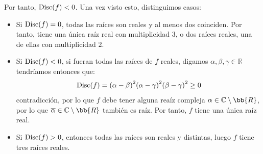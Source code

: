 \begin{ejercicio}
    Por tanto, $\operatorname{Disc}(f) < 0$. Una vez visto esto, distinguimos casos:
    \begin{itemize}
        \item Si $\operatorname{Disc}(f) = 0$, todas las raíces son reales y al menos dos coinciden. Por tanto, tiene una única raíz real con multiplicidad $3$, o dos raíces reales, una de ellas con multiplicidad $2$.
        \item Si $\operatorname{Disc}(f) < 0$, si fueran todas las raíces de $f$ reales, digamos $\alpha,\beta,\gamma\in \mathbb{R}$ tendríamos entonces que:
            \begin{equation*}
                \operatorname{Disc}(f) = {(\alpha-\beta)}^{2}{(\alpha-\gamma)}^{2}{(\beta-\gamma)}^{2} \geq 0
            \end{equation*}
            contradicción, por lo que $f$ debe tener alguna reaíz compleja $\alpha\in \mathbb{C}\setminus \bb{R}$, por lo que $\overline{\alpha}\in \mathbb{C}\setminus \bb{R}$ también es raíz. Por tanto, $f$ tiene una única raíz real.
        \item Si $\operatorname{Disc}(f) > 0$, entonces todas las raíces son reales y distintas, luego $f$ tiene tres raíces reales.
    \end{itemize}
\end{ejercicio}


